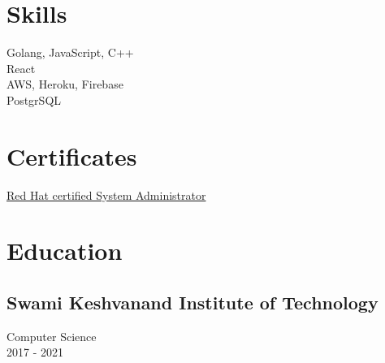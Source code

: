 \documentclass[]{Kushagra-build}
\begin{document}
\begin{minipage}[t]{0.29\textwidth}


\section{Skills}
\vspace{0.1em}
Golang, JavaScript, C++\\ 

\vspace{0.5em}
React \\

\vspace{0.5em}
AWS, Heroku, Firebase \\
\vspace{0.5em}
PostgrSQL \\

\sectionsep

\section{Certificates}
\href{https://rhtapps.redhat.com/certifications/badge/verify/JBADVLBCAISWJFM6KOGIYCQ6PYAEQU3CUPSQX2KSDXT6RW46LQ3T7ULZ55KZZ56SKO7EQ3ETTLYZQ4U5NQYTCNA62RUWOCM34WWBUYQ=}{Red Hat certified System Administrator\faLink} \\
\sectionsep

\section{Education} 

\subsection{Swami Keshvanand Institute of Technology}
Computer Science \\
2017 - 2021 \\
\sectionsep


\end{minipage}
\end{document}
